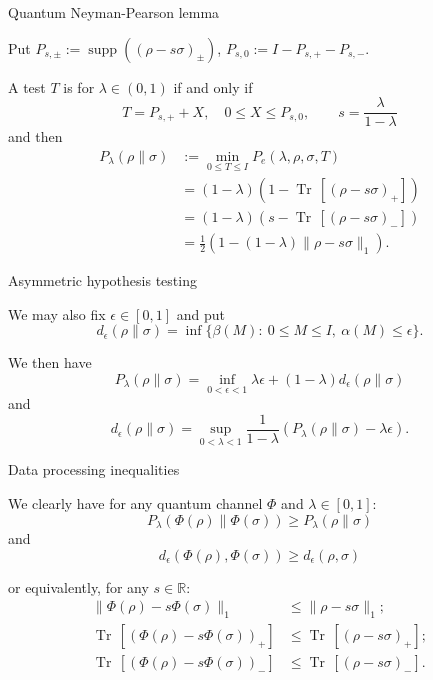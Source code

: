 \documentclass[mathserif]{beamer}
\newcommand{\<}{\langle}
\renewcommand{\>}{\rangle}
\newcommand{\supp}{\operatorname{supp}}
\newcommand{\Tr}{\operatorname{Tr}\,}
\begin{document}
\begin{frame}{Quantum Neyman-Pearson lemma}


 Put $P_{s,\pm}:=\supp((\rho-s\sigma)_\pm)$, $P_{s,0}:=I-P_{s,+}-P_{s,-}$.


\bigskip
 A test $T$ is  for $\lambda\in (0,1)$ if and only if
\[
T=P_{s,+}+X,\quad 0\le X\le P_{s,0},\qquad s=\frac{\lambda}{1-\lambda}
\]
and then
\begin{align*}
P_\lambda(\rho\|\sigma)&:=\min_{0\le T\le I} P_e(\lambda,\rho,\sigma,T)\\
&=(1-\lambda)(1-\Tr[(\rho-s\sigma)_+])\\
&=(1-\lambda)(s-\Tr[(\rho-s\sigma)_-])\\
&=\frac12(1-(1-\lambda)\|\rho-s\sigma\|_1).
\end{align*}



\end{frame}


\begin{frame}{Asymmetric hypothesis testing}

We may also fix $\epsilon\in [0,1]$ and put
\[
d_\epsilon(\rho\|\sigma)=\inf\{\beta(M) :\ 0\le M\le I,\ \alpha(M)\le \epsilon\}.
\]

We then have
\[
P_\lambda(\rho\|\sigma) =\inf_{0<\epsilon<1}\lambda \epsilon
+(1-\lambda)d_\epsilon(\rho\|\sigma)
\]
and
\[
d_\epsilon(\rho\|\sigma)=\sup_{0<\lambda<1}
\frac{1}{1-\lambda}(P_\lambda(\rho\|\sigma)-\lambda\epsilon).
\]

\end{frame}




\begin{frame}{Data processing inequalities}

 We clearly have  for any quantum channel $\Phi$ and $\lambda\in [0,1]$:
\[
P_\lambda(\Phi(\rho)\|\Phi(\sigma))\ge P_\lambda(\rho\|\sigma)
\]
and
\[
d_\epsilon(\Phi(\rho),\Phi(\sigma))\ge d_\epsilon(\rho,\sigma)
\]

\medskip

or equivalently, for any $s\in \mathbb R$:
\begin{align*}
\|\Phi(\rho)-s\Phi(\sigma)\|_1&\le \|\rho-s\sigma\|_1;\\[0.3em]
\Tr[(\Phi(\rho)-s\Phi(\sigma))_+]&\le \Tr[(\rho-s\sigma)_+];\\[0.3em]
\Tr[(\Phi(\rho)-s\Phi(\sigma))_-]&\le \Tr[(\rho-s\sigma)_-].
\end{align*}




\end{frame}
\end{document}
